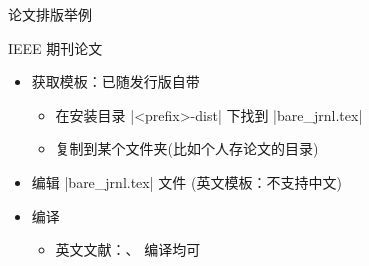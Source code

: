 \begin{frame}[fragile]{论文排版举例}
  \begin{exampleblock}{IEEE 期刊论文}
    \begin{itemize}
      \item 获取模板：已随发行版自带
        \begin{itemize}
          \item 在安装目录 |<prefix>\texlive{}\texmf-dist\doc\latex\IEEEtran|
            下找到 |bare_jrnl.tex|
          \item 复制到某个文件夹(比如个人存论文的目录)
        \end{itemize}
      \item 编辑 |bare_jrnl.tex| 文件 (英文模板：不支持中文)
      \item 编译
        \begin{itemize}
          \item 英文文献：\XeLaTeX{}、\pdfLaTeX{} 编译均可
        \end{itemize}
    \end{itemize}
  \end{exampleblock}
\end{frame}
